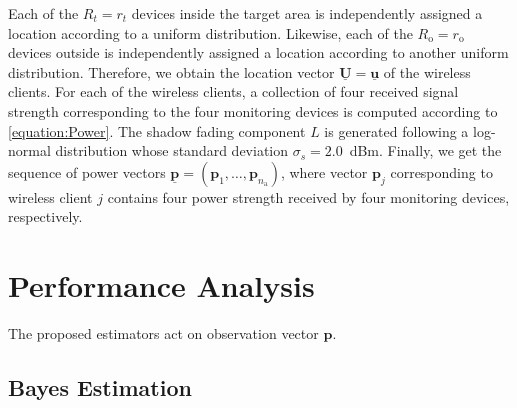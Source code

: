 Each of the $R_{{t}} = r_{{t}}$ devices inside the target area is independently assigned a location according to a uniform distribution.
Likewise, each of the $R_{\mathrm{o}} = r_{\mathrm{o}}$ devices outside is independently assigned a location according to another uniform distribution.
Therefore, we obtain the location vector $\underline{\mathbf{U}} = \underline{\mathbf{u}}$ of the wireless clients.
For each of the wireless clients, a collection of four received signal strength corresponding to the four monitoring devices is computed according to \eqref{equation:Power}.
The shadow fading component $L$ is generated following a log-normal distribution whose standard deviation $\sigma_{s}=2.0$~dBm.
Finally, we get the sequence of power vectors $\underline{\mathbf{p}} = (\mathbf{p}_1, \ldots, \mathbf{p}_{n_{\mathrm{a}}})$, where vector $\mathbf{p}_j$ corresponding to wireless client $j$ contains four power strength received by four monitoring devices, respectively.


\section{Performance Analysis}

The proposed estimators act on observation vector $\mathbf{p}$.


\subsection{Bayes Estimation}

